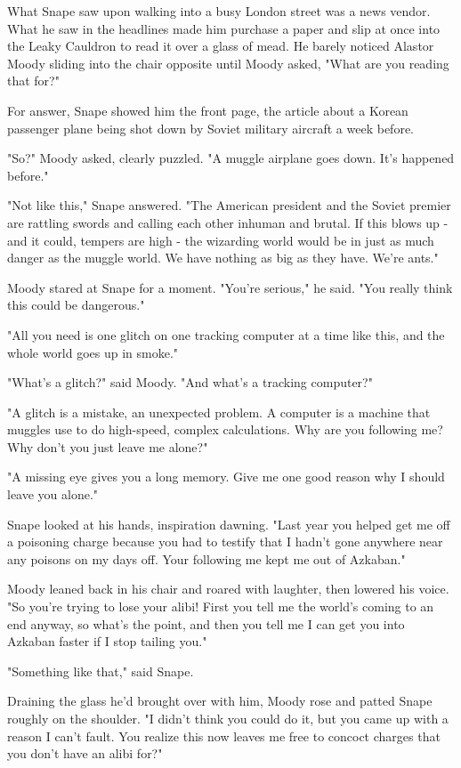What Snape saw upon walking into a busy London street was a news vendor. What he saw in the headlines made him purchase a paper and slip at once into the Leaky Cauldron to read it over a glass of mead. He barely noticed Alastor Moody sliding into the chair opposite until Moody asked, "What are you reading that for?"

For answer, Snape showed him the front page, the article about a Korean passenger plane being shot down by Soviet military aircraft a week before.

"So?" Moody asked, clearly puzzled. "A muggle airplane goes down. It's happened before."

"Not like this," Snape answered. "The American president and the Soviet premier are rattling swords and calling each other inhuman and brutal. If this blows up - and it could, tempers are high - the wizarding world would be in just as much danger as the muggle world. We have nothing as big as they have. We're ants."

Moody stared at Snape for a moment. "You're serious," he said. "You really think this could be dangerous."

"All you need is one glitch on one tracking computer at a time like this, and the whole world goes up in smoke."

"What's a glitch?" said Moody. "And what's a tracking computer?"

"A glitch is a mistake, an unexpected problem. A computer is a machine that muggles use to do high-speed, complex calculations. Why are you following me? Why don't you just leave me alone?"

"A missing eye gives you a long memory. Give me one good reason why I should leave you alone."

Snape looked at his hands, inspiration dawning. "Last year you helped get me off a poisoning charge because you had to testify that I hadn't gone anywhere near any poisons on my days off. Your following me kept me out of Azkaban."

Moody leaned back in his chair and roared with laughter, then lowered his voice. "So you're trying to lose your alibi! First you tell me the world's coming to an end anyway, so what's the point, and then you tell me I can get you into Azkaban faster if I stop tailing you."

"Something like that," said Snape.

Draining the glass he'd brought over with him, Moody rose and patted Snape roughly on the shoulder. "I didn't think you could do it, but you came up with a reason I can't fault. You realize this now leaves me free to concoct charges that you don't have an alibi for?"

